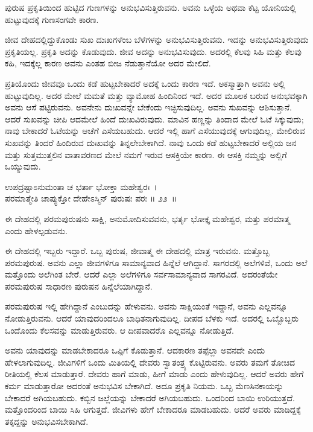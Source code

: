 \begin{artha}
ಪುರುಷ ಪ್ರಕೃತಿಯಿಂದ ಹುಟ್ಟಿದ ಗುಣಗಳನ್ನು ಅನುಭವಿಸುತ್ತಿರುವನು. ಅವನು ಒಳ್ಳೆಯ ಅಥವಾ ಕೆಟ್ಟ ಯೋನಿಯಲ್ಲಿ ಹುಟ್ಟುವುದಕ್ಕೆ ಗುಣಸಂಗವೇ ಕಾರಣ.
\end{artha}

ಜೀವ ದೇಹದಲ್ಲಿದ್ದುಕೊಂಡು ಸುಖ ದುಃಖಗಳೆಂಬ ಬೆಳೆಗಳನ್ನು ಅನುಭವಿಸುತ್ತಿರುವನು. ಇದನ್ನು ಅನುಭವಿಸುತ್ತಿರುವುದು ಪ್ರಕೃತಿಯಲ್ಲ. ಪ್ರಕೃತಿ ಅದನ್ನು ಕೊಡುವುದು. ಜೀವ ಅದನ್ನು ಅನುಭವಿಸುವುದು. ಅದರಲ್ಲಿ ಕೆಲವು ಸಿಹಿ ಮತ್ತು ಕೆಲವು ಕಹಿ, ಇದಕ್ಕೆಲ್ಲ ಕಾರಣ ಅವನು ಎಂತಹ ಬೀಜ ನೆಡುತ್ತಾನೆಯೋ ಅದರ ಮೇಲಿದೆ.

ಪ್ರತಿಯೊಂದು ಜೀವವೂ ಒಂದು ಕಡೆ ಹುಟ್ಟಬೇಕಾದರೆ ಅದಕ್ಕೆ ಒಂದು ಕಾರಣ ಇದೆ. ಅಕಸ್ಮಾತ್ತಾಗಿ ಅವನು ಅಲ್ಲಿ ಹುಟ್ಟುವುದಿಲ್ಲ. ಅದರ ಮೇಲೆ ಮಮತೆ ಮತ್ತು ವ್ಯಾಮೋಹ ಹಿಂದಿನಿಂದ ಇದೆ. ಅದರ ಮೂಲಕ ಬರುವ ಅನುಭವಕ್ಕಾಗಿ ಅವನು ಆಸೆ ಪಟ್ಟಿರುವನು. ಅವನೇನು ದುಃಖವನ್ನೇ ಬೇಕೆಂದು ಇಚ್ಛಿಸುವುದಿಲ್ಲ. ಅವನು ಸುಖವನ್ನು ಆಶಿಸುತ್ತಾನೆ. ಆದರೆ ಸುಖವನ್ನು ಚೀಪಿ ಆದಮೇಲೆ ಹಿಂದೆ ದುಃಖವಿರುವುದು. ಮಾವಿನ ಹಣ್ಣನ್ನು ತಿಂದಾದ ಮೇಲೆ ಓಟೆ ಸಿಕ್ಕುವುದು; ನಾವು ಬೇಕಾದರೆ ಓಟೆಯನ್ನು ಆಚೆಗೆ ಎಸೆಯಬಹುದು. ಆದರೆ ಇಲ್ಲಿ ಹಾಗೆ ಎಸೆಯುವುದಕ್ಕೆ ಆಗುವುದಿಲ್ಲ. ಮೇಲಿರುವ ಸುಖವನ್ನು ತಿಂದರೆ ಹಿಂದಿರುವ ದುಃಖವನ್ನು ತಿನ್ನಲೇಬೇಕಾಗಿದೆ. ನಾವು ಒಂದು ಕಡೆ ಹುಟ್ಟಬೇಕಾದರೆ ಅಲ್ಲಿಯ ಜನ ಮತ್ತು ಸುತ್ತಮುತ್ತಲಿನ ವಾತಾವರಣದ ಮೇಲೆ ನಮಗೆ ಇರುವ ಆಸಕ್ತಿಯೇ ಕಾರಣ. ಈ ಆಸಕ್ತಿ ನಮ್ಮನ್ನು ಅಲ್ಲಿಗೆ ಒಯ್ಯುವುದು.

\begin{shloka}
ಉಪದ್ರಷ್ಟಾಽನುಮಂತಾ ಚ ಭರ್ತಾ ಭೋಕ್ತಾ ಮಹೇಶ್ವರಃ~।\\ಪರಮಾತ್ಮೇತಿ ಚಾಪ್ಯುಕ್ತೋ ದೇಹೇಽಸ್ಮಿನ್ ಪುರುಷಃ ಪರಃ \hfill॥ ೨೨~॥
\end{shloka}

\begin{artha}
ಈ ದೇಹದಲ್ಲಿ ಪರಮಪುರುಷನು ಸಾಕ್ಷಿ, ಅನುಮೋದಿಸುವವನು, ಭರ್ತೃ ಭೋಕ್ತೃ ಮಹೇಶ್ವರ, ಮತ್ತು ಪರಮಾತ್ಮ ಎಂದು ಹೇಳಲ್ಪಡುವನು.
\end{artha}

ಈ ದೇಹದಲ್ಲಿ ಇಬ್ಬರು ಇದ್ದಾರೆ. ಒಬ್ಬ ಪುರುಷ, ಜೀವಾತ್ಮ ಈ ದೇಹದಲ್ಲಿ ಮಾತ್ರ ಇರುವನು. ಮತ್ತೊಬ್ಬ ಪರಮಪುರುಷ. ಅವನು ಎಲ್ಲಾ ಜೀವಗಳಿಗೂ ಸಾಮಾನ್ಯವಾದ ಹಿನ್ನೆಲೆ ಆಗಿದ್ದಾನೆ. ಸಾಗರದಲ್ಲಿ ಅಲೆಗಳಿವೆ, ಒಂದು ಅಲೆ ಮತ್ತೊಂದು ಅಲೆಗಿಂತ ಬೇರೆ. ಆದರೆ ಎಲ್ಲಾ ಅಲೆಗಳಿಗೂ ಸರ್ವಸಾಮಾನ್ಯವಾದ ಸಾಗರವಿದೆ. ಅದರಂತೆಯೇ ಪರಮಪುರುಷ ಸಾಧಾರಣ ಪುರುಷನ ಹಿನ್ನೆಲೆಯಾಗಿದ್ದಾನೆ.

ಪರಮಪುರುಷ ಇಲ್ಲಿ ಹೇಗಿದ್ದಾನೆ ಎಂಬುದನ್ನು ಹೇಳುವನು. ಅವನು ಸಾಕ್ಷಿಯಂತೆ ಇದ್ದಾನೆ, ಅವನು ಎಲ್ಲವನ್ನೂ ನೋಡುತ್ತಿರುವನು. ಆದರೆ ಯಾವುದರಿಂದಲೂ ಬಾಧಿತನಾಗುವುದಿಲ್ಲ. ದೀಪದ ಬೆಳಕು ಇದೆ. ಅದರಲ್ಲಿ ಒಬ್ಬೊಬ್ಬರು ಒಂದೊಂದು ಕೆಲಸವನ್ನು ಮಾಡುತ್ತಿರುವರು. ಆ ದೀಪವಾದರೊ ಎಲ್ಲವನ್ನೂ ನೋಡುತ್ತಿದೆ.

ಅವನು ಯಾವುದನ್ನು ಮಾಡಬೇಕಾದರೂ ಒಪ್ಪಿಗೆ ಕೊಡುತ್ತಾನೆ. ಆದಕಾರಣ ತಪ್ಪೆಲ್ಲಾ ಅವನದೇ ಎಂದು ಹೇಳಲಾಗುವುದಿಲ್ಲ. ಜೀವಿಗಳಿಗೆ ಒಂದು ಮಿತಿಯಲ್ಲಿ ದೇವರು ಸ್ವಾತಂತ್ರ್ಯ ಕೊಟ್ಟಿರುವನು. ಅವರು ತಮಗೆ ತೋಚಿದ ರೀತಿಯಲ್ಲಿ ಕೆಲಸ ಮಾಡುತ್ತಾರೆ. ದೇವರು ಹಾಗೆ ಮಾಡು, ಹೀಗೆ ಮಾಡು ಎಂದು ಹೇಳುವುದಿಲ್ಲ. ಆದರೆ ಅವರು ಹೇಗೆ ಕರ್ಮ ಮಾಡುತ್ತಾರೋ ಅದರಂತೆ ಅನುಭವಿಸ ಬೇಕಾಗಿದೆ. ಅದೂ ಪ್ರಕೃತಿ ನಿಯಮ. ಒಬ್ಬ ಮೆಣಸಿನಕಾಯನ್ನು ಬೇಕಾದರೆ ಅಗಿಯಬಹುದು. ಕಬ್ಬಿನ ಜಲ್ಲೆಯನ್ನು ಬೇಕಾದರೆ ಅಗಿಯಬಹುದು. ಒಂದರಿಂದ ಬಾಯಿ ಉರಿಯುತ್ತದೆ. ಮತ್ತೊಂದರಿಂದ ಬಾಯಿ ಸಿಹಿ ಆಗುತ್ತದೆ. ಜೀವಿಗಳು ಹೇಗೆ ಬೇಕಾದರೂ ಮಾಡಬಹುದು. ಆದರೆ ಅವರು ಮಾಡಿದ್ದಕ್ಕೆ ತಕ್ಕದ್ದನ್ನು ಅನುಭವಿಸಬೇಕಾಗಿದೆ.

